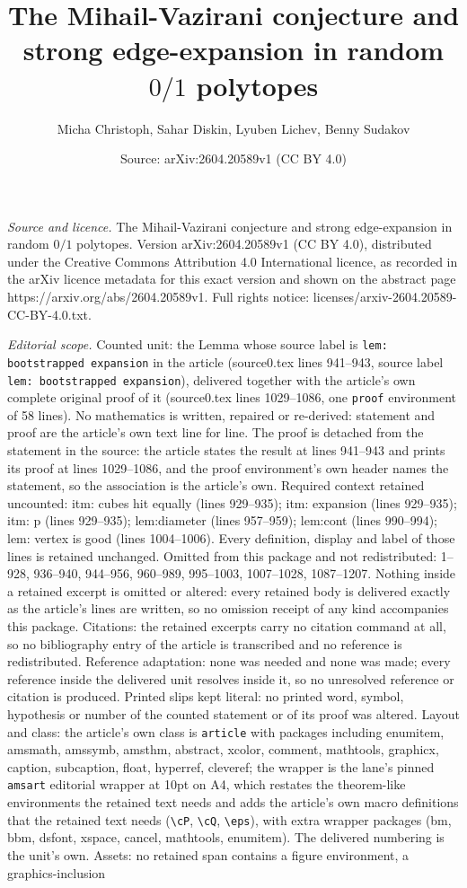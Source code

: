 \documentclass[10pt,a4paper]{amsart}
\title[The Mihail-Vazirani conjecture and strong edge-expansion in ]{The Mihail-Vazirani conjecture and strong edge-expansion in random $0/1$ polytopes}
\author{Micha Christoph, Sahar Diskin, Lyuben Lichev, Benny Sudakov}
\date{Source: arXiv:2604.20589v1 (CC BY 4.0)}
\begin{document}
\maketitle

\noindent\emph{Source and licence.} The Mihail-Vazirani conjecture and strong edge-expansion in random $0/1$ polytopes. Version arXiv:2604.20589v1 (CC BY 4.0), distributed under the Creative Commons Attribution 4.0 International licence, as recorded in the arXiv licence metadata for this exact version and shown on the abstract page https://arxiv.org/abs/2604.20589v1. Full rights notice: licenses/arxiv-2604.20589-CC-BY-4.0.txt.\par\smallskip

\noindent\textit{Editorial scope.} Counted unit: the Lemma whose source label is \texttt{lem: bootstrapped expansion} in the article (source0.tex lines 941--943, source label \texttt{lem: bootstrapped expansion}), delivered together with the article's own complete original proof of it (source0.tex lines 1029--1086, one \texttt{proof} environment of 58 lines). No mathematics is written, repaired or re-derived: statement and proof are the article's own text line for line. The proof is detached from the statement in the source: the article states the result at lines 941--943 and prints its proof at lines 1029--1086, and the proof environment's own header names the statement, so the association is the article's own. Required context retained uncounted: itm: cubes hit equally (lines 929--935); itm: expansion (lines 929--935); itm: p (lines 929--935); lem:diameter (lines 957--959); lem:cont (lines 990--994); lem: vertex is good (lines 1004--1006). Every definition, display and label of those lines is retained unchanged. Omitted from this package and not redistributed: 1--928, 936--940, 944--956, 960--989, 995--1003, 1007--1028, 1087--1207. Nothing inside a retained excerpt is omitted or altered: every retained body is delivered exactly as the article's lines are written, so no omission receipt of any kind accompanies this package. Citations: the retained excerpts carry no citation command at all, so no bibliography entry of the article is transcribed and no reference is redistributed. Reference adaptation: none was needed and none was made; every reference inside the delivered unit resolves inside it, so no unresolved reference or citation is produced. Printed slips kept literal: no printed word, symbol, hypothesis or number of the counted statement or of its proof was altered. Layout and class: the article's own class is \texttt{article} with packages including enumitem, amsmath, amssymb, amsthm, abstract, xcolor, comment, mathtools, graphicx, caption, subcaption, float, hyperref, cleveref; the wrapper is the lane's pinned \texttt{amsart} editorial wrapper at 10pt on A4, which restates the theorem-like environments the retained text needs and adds the article's own macro definitions that the retained text needs (\texttt{\textbackslash cP}, \texttt{\textbackslash cQ}, \texttt{\textbackslash eps}), with extra wrapper packages (bm, bbm, dsfont, xspace, cancel, mathtools, enumitem). The delivered numbering is the unit's own. Assets: no retained span contains a figure environment, a graphics-inclusion 
\end{document}
